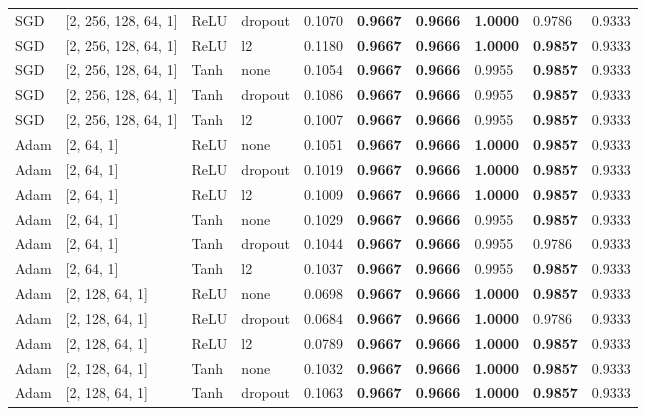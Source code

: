 \documentclass[12pt,a4paper]{article}
\begin{document}
\begin{table}[h]
\begin{tabular}{llllllllll}
SGD & [2, 256, 128, 64, 1] & ReLU & dropout & 0.1070 & \textbf{0.9667} & \textbf{0.9666} & \textbf{1.0000} & 0.9786 & 0.9333 \\
SGD & [2, 256, 128, 64, 1] & ReLU & l2 & 0.1180 & \textbf{0.9667} & \textbf{0.9666} & \textbf{1.0000} & \textbf{0.9857} & 0.9333 \\
SGD & [2, 256, 128, 64, 1] & Tanh & none & 0.1054 & \textbf{0.9667} & \textbf{0.9666} & 0.9955 & \textbf{0.9857} & 0.9333 \\
SGD & [2, 256, 128, 64, 1] & Tanh & dropout & 0.1086 & \textbf{0.9667} & \textbf{0.9666} & 0.9955 & \textbf{0.9857} & 0.9333 \\
SGD & [2, 256, 128, 64, 1] & Tanh & l2 & 0.1007 & \textbf{0.9667} & \textbf{0.9666} & 0.9955 & \textbf{0.9857} & 0.9333 \\
Adam & [2, 64, 1] & ReLU & none & 0.1051 & \textbf{0.9667} & \textbf{0.9666} & \textbf{1.0000} & \textbf{0.9857} & 0.9333 \\
Adam & [2, 64, 1] & ReLU & dropout & 0.1019 & \textbf{0.9667} & \textbf{0.9666} & \textbf{1.0000} & \textbf{0.9857} & 0.9333 \\
Adam & [2, 64, 1] & ReLU & l2 & 0.1009 & \textbf{0.9667} & \textbf{0.9666} & \textbf{1.0000} & \textbf{0.9857} & 0.9333 \\
Adam & [2, 64, 1] & Tanh & none & 0.1029 & \textbf{0.9667} & \textbf{0.9666} & 0.9955 & \textbf{0.9857} & 0.9333 \\
Adam & [2, 64, 1] & Tanh & dropout & 0.1044 & \textbf{0.9667} & \textbf{0.9666} & 0.9955 & 0.9786 & 0.9333 \\
Adam & [2, 64, 1] & Tanh & l2 & 0.1037 & \textbf{0.9667} & \textbf{0.9666} & 0.9955 & \textbf{0.9857} & 0.9333 \\
Adam & [2, 128, 64, 1] & ReLU & none & 0.0698 & \textbf{0.9667} & \textbf{0.9666} & \textbf{1.0000} & \textbf{0.9857} & 0.9333 \\
Adam & [2, 128, 64, 1] & ReLU & dropout & 0.0684 & \textbf{0.9667} & \textbf{0.9666} & \textbf{1.0000} & 0.9786 & 0.9333 \\
Adam & [2, 128, 64, 1] & ReLU & l2 & 0.0789 & \textbf{0.9667} & \textbf{0.9666} & \textbf{1.0000} & \textbf{0.9857} & 0.9333 \\
Adam & [2, 128, 64, 1] & Tanh & none & 0.1032 & \textbf{0.9667} & \textbf{0.9666} & \textbf{1.0000} & \textbf{0.9857} & 0.9333 \\
Adam & [2, 128, 64, 1] & Tanh & dropout & 0.1063 & \textbf{0.9667} & \textbf{0.9666} & \textbf{1.0000} & \textbf{0.9857} & 0.9333 \\

\end{tabular}
\end{table}
\end{document}
